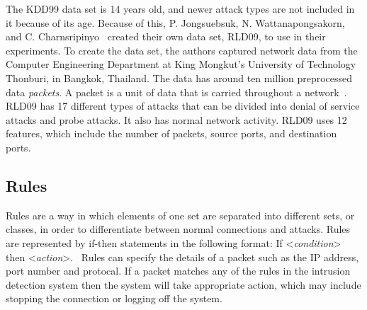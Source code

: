\documentclass{sig-alternate}
\begin{document}
The KDD99 data set is 14 years old, and newer attack types are not included in it because of its age. Because of this, P. Jongsuebsuk, N. Wattanapongsakorn, and
C. Charnsripinyo~\cite{6496342, 6559603} created their own data set, RLD09, to use in their experiments. To create the data set, the authors captured network data from the Computer Engineering Department at King Mongkut's University of Technology Thonburi, in Bangkok, Thailand. The data has around ten million preprocessed data \emph{packets}. A packet is a unit of data that is carried throughout a network~\cite{networkPacket}. RLD09 has 17 different types of attacks that can be divided into denial of service attacks and probe attacks. It also has normal network activity. RLD09 uses 12 features, which include the number of packets, source ports, and destination ports.




\subsection{Rules}
\label{sec:rules}
Rules are a way in which elements of one set are separated into different sets, or classes, in order to differentiate between normal connections and attacks. Rules are represented by if-then statements in the following format: If <\emph{condition}> then <\emph{action}>.~\cite{bapuji2012soft} Rules can specify the details of a packet such as the IP address, port number and protocal. If a packet matches any of the rules in the intrusion detection system then the system will take appropriate action, which may include stopping the connection or logging off the system.~\cite{DBLP:journals/corr/abs-1204-6416}
\end{document}
